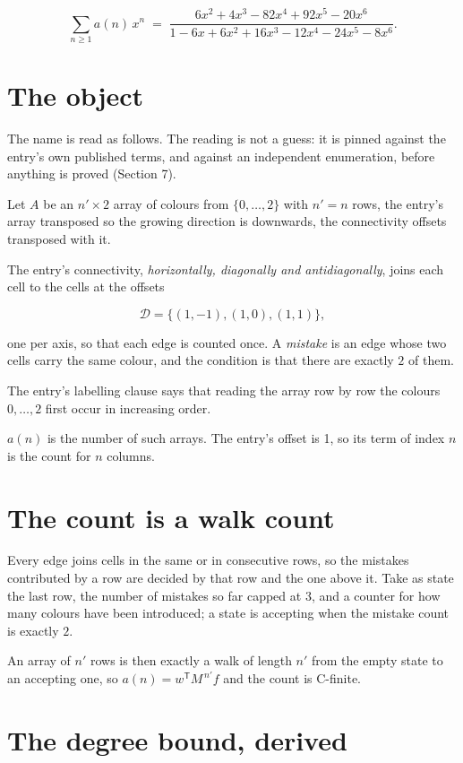 \documentclass[11pt]{article}
\theoremstyle{definition}
\begin{document}
\[\sum_{n \ge 1} a(n)\,x^n \;=\; \frac{6x^{2} + 4x^{3} - 82x^{4} + 92x^{5} - 20x^{6}}{1 - 6x + 6x^{2} + 16x^{3} - 12x^{4} - 24x^{5} - 8x^{6}}.\]

\section{The object}

The name is read as follows. The reading is not a guess: it is pinned against the entry's own published terms, and against an independent enumeration, before anything is proved (Section 7).

Let $A$ be an $n' \times 2$ array of colours from $\{0,\dots,2\}$ with $n' = n$ rows, the entry's array transposed so the growing direction is downwards, the connectivity offsets transposed with it.

The entry's connectivity, {\itshape horizontally, diagonally and antidiagonally}, joins each cell to the cells at the offsets

\[\mathcal{D} = \{(1,-1), (1,0), (1,1)\},\]

one per axis, so that each edge is counted once. A {\itshape mistake} is an edge whose two cells carry the same colour, and the condition is that there are exactly $2$ of them.

The entry's labelling clause says that reading the array row by row the colours $0,\dots,2$ first occur in increasing order.

$a(n)$ is the number of such arrays. The entry's offset is 1, so its term of index $n$ is the count for $n$ columns.

\section{The count is a walk count}

Every edge joins cells in the same or in consecutive rows, so the mistakes contributed by a row are decided by that row and the one above it. Take as state the last row, the number of mistakes so far capped at $3$, and a counter for how many colours have been introduced; a state is accepting when the mistake count is exactly $2$.

An array of $n'$ rows is then exactly a walk of length $n'$ from the empty state to an accepting one, so $a(n) = w^{\mathsf T}M^{\,n'}f$ and the count is C-finite.

\section{The degree bound, derived}
\end{document}
